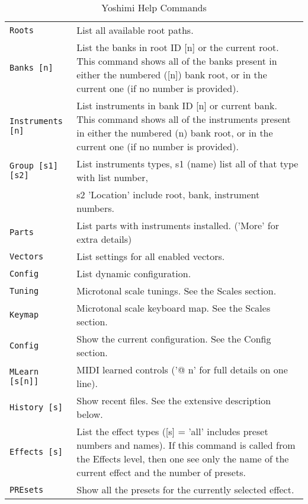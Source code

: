 \begin{center}
\begin{longtable}{p{4cm} p{10cm}}
\caption[Yoshimi Help Commands]{Yoshimi Help Commands} \\

\texttt{Roots} &
   List all available root paths. \\
\texttt{Banks [n]} &
   List the banks in root ID [n] or the current root.
   This command shows all of the banks present in either the numbered ([n])
   bank root, or in the current one (if no number is provided).  \\
\texttt{Instruments [n]} &
   List instruments in bank ID [n] or current bank.
   This command shows all of the instruments present in either the numbered
   (n) bank root, or in the current one (if no number is provided).  \\
\texttt{Group [s1] [s2]} &
   List instruments types, s1 (name) list all of that type with list number, \\
\texttt{ } &
   s2 'Location' include root, bank, instrument numbers. \\
\texttt{Parts} &
   List parts with instruments installed. ('More' for extra details)\\
\texttt{Vectors} &
   List settings for all enabled vectors. \\
\texttt{Config} &
   List dynamic configuration. \\
\texttt{Tuning} &
   Microtonal scale tunings. See the Scales section. \\
\texttt{Keymap} &
   Microtonal scale keyboard map.  See the Scales section. \\
\texttt{Config} &
   Show the current configuration. See the Config section. \\
\texttt{MLearn [s[n]]} &
   MIDI learned controls ('@ n' for full details on one line). \\
\texttt{History [s]} &
   Show recent files. See the extensive description below. \\
\texttt{Effects [s]} &
   List the effect types ([s] = 'all' includes preset numbers and names).
   If this command is called from the Effects level, then one see only the name
   of the current effect and the number of presets. \\
\texttt{PREsets} &
   Show all the presets for the currently selected effect. \\

\end{longtable}
\end{center}

